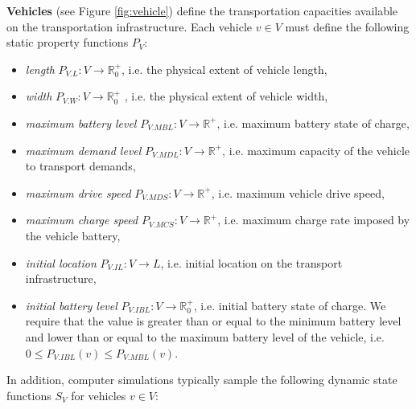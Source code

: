 \documentclass[graybox]{svmult}
\begin{document}
\vspace{2mm}
\noindent
\textbf{Vehicles} (see Figure \ref{fig:vehicle})
 define the transportation capacities available on the transportation infrastructure. Each vehicle $v \in V$ must define the following static property functions $P_V$:
\begin{itemize}
	\item \textit{length} $P_{V.L}: V \rightarrow \mathbb{R}_0^+$, i.e. the physical extent of vehicle length,
	\item \textit{width} $P_{V.W}: V \rightarrow \mathbb{R}_0^+$ , i.e. the physical extent of vehicle width, 
	\item \textit{maximum battery level} $P_{V.MBL}: V \rightarrow \mathbb{R}^+$, i.e. maximum battery state of charge, 
	\item \textit{maximum demand level} $P_{V.MDL}: V \rightarrow \mathbb{R}^+$, i.e. maximum capacity of the vehicle to transport demands,
	\item \textit{maximum drive speed} $P_{V.MDS}: V \rightarrow \mathbb{R}^+$, i.e. maximum vehicle drive speed, 
	\item \textit{maximum charge speed} $P_{V.MCS}: V \rightarrow \mathbb{R}^+$, i.e. maximum charge rate imposed by the vehicle battery,
	\item \textit{initial location} $P_{V.IL}: V \rightarrow L$, i.e. initial location on the transport infrastructure, 
	\item \textit{initial battery level} $P_{V.IBL}: V \rightarrow \mathbb{R}_0^+$, i.e. initial battery state of charge. We require that the value is greater than or equal to the minimum battery level and lower than or equal to the maximum battery level of the vehicle, i.e.\ $0 \leq P_{V.IBL}(v) \leq P_{V.MBL}(v)$.
\end{itemize}
In addition, computer simulations typically sample the following dynamic state functions $S_{V}$ for vehicles $v \in V$:
\end{document}
